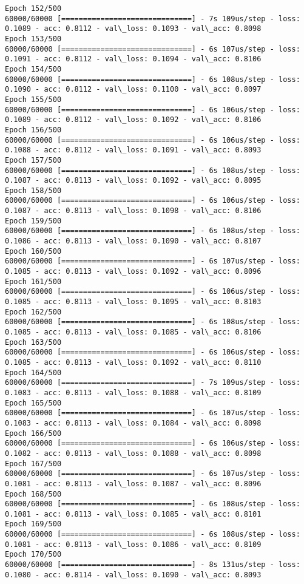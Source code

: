 \documentclass[11pt]{article}
\begin{document}
\begin{Verbatim}[commandchars=\\\{\}]
Epoch 152/500
60000/60000 [==============================] - 7s 109us/step - loss: 0.1089 - acc: 0.8112 - val\_loss: 0.1093 - val\_acc: 0.8098
Epoch 153/500
60000/60000 [==============================] - 6s 107us/step - loss: 0.1091 - acc: 0.8112 - val\_loss: 0.1094 - val\_acc: 0.8106
Epoch 154/500
60000/60000 [==============================] - 6s 108us/step - loss: 0.1090 - acc: 0.8112 - val\_loss: 0.1100 - val\_acc: 0.8097
Epoch 155/500
60000/60000 [==============================] - 6s 106us/step - loss: 0.1089 - acc: 0.8112 - val\_loss: 0.1092 - val\_acc: 0.8106
Epoch 156/500
60000/60000 [==============================] - 6s 106us/step - loss: 0.1088 - acc: 0.8112 - val\_loss: 0.1091 - val\_acc: 0.8093
Epoch 157/500
60000/60000 [==============================] - 6s 108us/step - loss: 0.1087 - acc: 0.8113 - val\_loss: 0.1092 - val\_acc: 0.8095
Epoch 158/500
60000/60000 [==============================] - 6s 106us/step - loss: 0.1087 - acc: 0.8113 - val\_loss: 0.1098 - val\_acc: 0.8106
Epoch 159/500
60000/60000 [==============================] - 6s 108us/step - loss: 0.1086 - acc: 0.8113 - val\_loss: 0.1090 - val\_acc: 0.8107
Epoch 160/500
60000/60000 [==============================] - 6s 107us/step - loss: 0.1085 - acc: 0.8113 - val\_loss: 0.1092 - val\_acc: 0.8096
Epoch 161/500
60000/60000 [==============================] - 6s 106us/step - loss: 0.1085 - acc: 0.8113 - val\_loss: 0.1095 - val\_acc: 0.8103
Epoch 162/500
60000/60000 [==============================] - 6s 108us/step - loss: 0.1085 - acc: 0.8113 - val\_loss: 0.1085 - val\_acc: 0.8106
Epoch 163/500
60000/60000 [==============================] - 6s 106us/step - loss: 0.1085 - acc: 0.8113 - val\_loss: 0.1092 - val\_acc: 0.8110
Epoch 164/500
60000/60000 [==============================] - 7s 109us/step - loss: 0.1083 - acc: 0.8113 - val\_loss: 0.1088 - val\_acc: 0.8109
Epoch 165/500
60000/60000 [==============================] - 6s 107us/step - loss: 0.1083 - acc: 0.8113 - val\_loss: 0.1084 - val\_acc: 0.8098
Epoch 166/500
60000/60000 [==============================] - 6s 106us/step - loss: 0.1082 - acc: 0.8113 - val\_loss: 0.1088 - val\_acc: 0.8098
Epoch 167/500
60000/60000 [==============================] - 6s 107us/step - loss: 0.1081 - acc: 0.8113 - val\_loss: 0.1087 - val\_acc: 0.8096
Epoch 168/500
60000/60000 [==============================] - 6s 108us/step - loss: 0.1081 - acc: 0.8113 - val\_loss: 0.1085 - val\_acc: 0.8101
Epoch 169/500
60000/60000 [==============================] - 6s 108us/step - loss: 0.1081 - acc: 0.8113 - val\_loss: 0.1086 - val\_acc: 0.8109
Epoch 170/500
60000/60000 [==============================] - 8s 131us/step - loss: 0.1080 - acc: 0.8114 - val\_loss: 0.1090 - val\_acc: 0.8093

\end{Verbatim}
\end{document}
